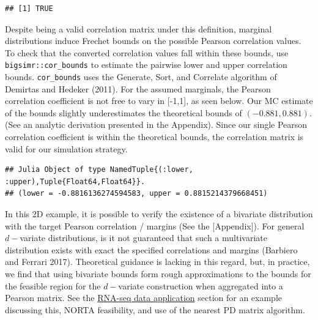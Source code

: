 \documentclass{article}
\newenvironment{Shaded}{\begin{snugshade}}{\end{snugshade}}
\newcommand{\AttributeTok}[1]{\textcolor[rgb]{0.77,0.63,0.00}{#1}}
\newcommand{\DecValTok}[1]{\textcolor[rgb]{0.00,0.00,0.81}{#1}}
\newcommand{\FloatTok}[1]{\textcolor[rgb]{0.00,0.00,0.81}{#1}}
\newcommand{\FunctionTok}[1]{\textcolor[rgb]{0.00,0.00,0.00}{#1}}
\newcommand{\NormalTok}[1]{#1}
\newcommand{\SpecialCharTok}[1]{\textcolor[rgb]{0.00,0.00,0.00}{#1}}
\begin{document}
\begin{verbatim}
## [1] TRUE
\end{verbatim}

Despite being a valid correlation matrix under this definition, marginal
distributions induce Frechet bounds on the possible Pearson correlation
values. To check that the converted correlation values fall within these
bounds, use \texttt{bigsimr::cor\_bounds} to estimate the pairwise lower
and upper correlation bounds. \texttt{cor\_bounds} uses the Generate,
Sort, and Correlate algorithm of Demirtas and Hedeker (2011). For the
assumed marginals, the Pearson correlation coefficient is not free to
vary in {[}-1,1{]}, as seen below. Our MC estimate of the bounds
slightly underestimates the theoretical bounds of \((-0.881, 0.881)\).
(See an analytic derivation presented in the Appendix). Since our single
Pearson correlation coefficient is within the theoretical bounds, the
correlation matrix is valid for our simulation strategy.

\begin{Shaded}
\end{Shaded}

\begin{verbatim}
## Julia Object of type NamedTuple{(:lower, :upper),Tuple{Float64,Float64}}.
## (lower = -0.8816136274594583, upper = 0.8815214379668451)
\end{verbatim}

In this 2D example, it is possible to verify the existence of a
bivariate distribution with the target Pearson correlation / margins
(See the {[}Appendix{]}). For general \(d-\)variate distributions, is it
not guaranteed that such a multivariate distribution exists with exact
the specified correlations and margins (Barbiero and Ferrari 2017).
Theoretical guidance is lacking in this regard, but, in practice, we
find that using bivariate bounds form rough approximations to the bounds
for the feasible region for the \(d-\)variate construction when
aggregated into a Pearson matrix. See the
\protect\hyperlink{examples}{RNA-seq data application} section for an
example discussing this, NORTA feasibility, and use of the nearest PD
matrix algorithm.
\end{document}
